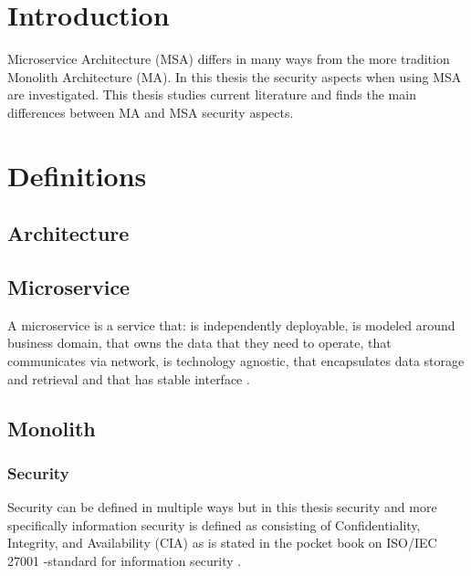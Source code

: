 


\section{Introduction}

Microservice Architecture (MSA) differs in many ways from 
the more tradition Monolith Architecture (MA).
In this thesis the security aspects when using MSA are investigated. 
This thesis studies current literature and finds the main differences between
MA and MSA security aspects.





\section{Definitions}

\subsection{Architecture}




\subsection{Microservice}

A microservice is a service that: is independently deployable,
is modeled around business domain,
that owns the data that they need to operate,
that communicates via network,
is technology agnostic,
that encapsulates data storage and retrieval and 
that has stable interface \citep{newman2019}.

\subsection{Monolith}


\subsubsection{Security}

Security can be defined in multiple ways but in this thesis security 
and more specifically information security is defined as consisting of 
Confidentiality, Integrity, and Availability (CIA) as is stated in the 
pocket book on ISO/IEC 27001 -standard for information security \citep{isoiec27001}.

